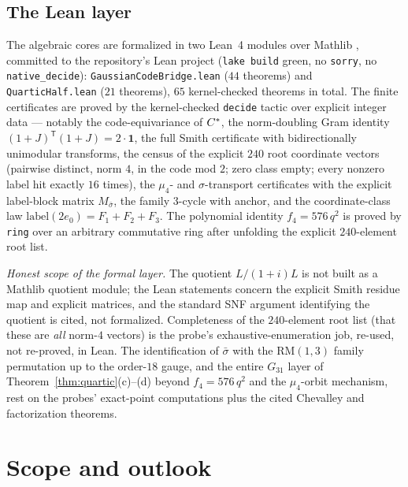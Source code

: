 \subsection{The Lean layer}
The algebraic cores are formalized in two Lean~4 modules over
Mathlib \cite{Moura21,mathlib}, committed to the repository's Lean
project (\texttt{lake build} green, no \texttt{sorry}, no
\texttt{native\_decide}): \texttt{GaussianCodeBridge.lean}
($44$ theorems) and \texttt{QuarticHalf.lean} ($21$ theorems), $65$
kernel-checked theorems in total.  The finite certificates are proved
by the kernel-checked \texttt{decide} tactic over explicit integer
data --- notably the code-equivariance of $C^{*}$, the norm-doubling
Gram identity $(1+J)^{\mathsf T}(1+J)=2\cdot\mathbf1$, the full Smith
certificate with bidirectionally unimodular transforms, the census of
the explicit $240$ root coordinate vectors (pairwise distinct, norm
$4$, in the code mod $2$; zero class empty; every nonzero label hit
exactly $16$ times), the $\mu_4$- and $\sigma$-transport certificates
with the explicit label-block matrix $M_{\bar\sigma}$, the family
$3$-cycle with anchor, and the coordinate-class law
$\mathrm{label}(2e_0)=F_1+F_2+F_3$.  The polynomial identity
$f_4=576\,q^2$ is proved by \texttt{ring} over an arbitrary
commutative ring after unfolding the explicit $240$-element root
list.

\emph{Honest scope of the formal layer.}  The quotient $L/(1+i)L$ is
not built as a Mathlib quotient module; the Lean statements concern
the explicit Smith residue map and explicit matrices, and the
standard SNF argument identifying the quotient is cited, not
formalized.  Completeness of the $240$-element root list (that these
are \emph{all} norm-$4$ vectors) is the probe's exhaustive-enumeration
job, re-used, not re-proved, in Lean.  The identification of
$\bar\sigma$ with the $\mathrm{RM}(1,3)$ family permutation up to the
order-$18$ gauge, and the entire $G_{31}$ layer of
Theorem~\ref{thm:quartic}(c)--(d) beyond $f_4=576\,q^2$ and the
$\mu_4$-orbit mechanism, rest on the probes' exact-point
computations plus the cited Chevalley and factorization theorems.

\section{Scope and outlook}\label{sec:scope}

